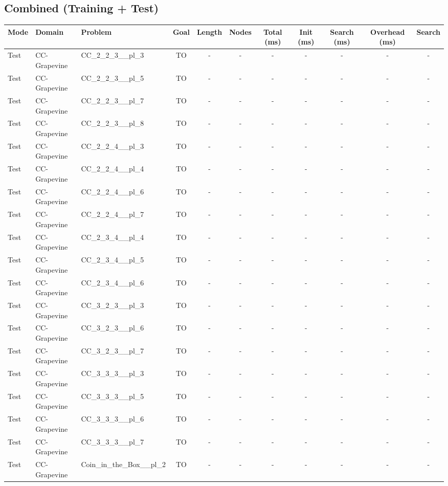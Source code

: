\documentclass{article}
\begin{document}
\subsection*{Combined (Training + Test)}
\begin{tabular}{lllcccccccc}
\toprule
Mode & Domain & Problem & Goal & Length & Nodes & Total (ms) & Init (ms) & Search (ms) & Overhead (ms) & Search \\
\midrule
Test & CC-Grapevine & CC\_2\_2\_3\_\_pl\_3 & TO & - & - & - & - & - & - & - \\
Test & CC-Grapevine & CC\_2\_2\_3\_\_pl\_5 & TO & - & - & - & - & - & - & - \\
Test & CC-Grapevine & CC\_2\_2\_3\_\_pl\_7 & TO & - & - & - & - & - & - & - \\
Test & CC-Grapevine & CC\_2\_2\_3\_\_pl\_8 & TO & - & - & - & - & - & - & - \\
Test & CC-Grapevine & CC\_2\_2\_4\_\_pl\_3 & TO & - & - & - & - & - & - & - \\
Test & CC-Grapevine & CC\_2\_2\_4\_\_pl\_4 & TO & - & - & - & - & - & - & - \\
Test & CC-Grapevine & CC\_2\_2\_4\_\_pl\_6 & TO & - & - & - & - & - & - & - \\
Test & CC-Grapevine & CC\_2\_2\_4\_\_pl\_7 & TO & - & - & - & - & - & - & - \\
Test & CC-Grapevine & CC\_2\_3\_4\_\_pl\_4 & TO & - & - & - & - & - & - & - \\
Test & CC-Grapevine & CC\_2\_3\_4\_\_pl\_5 & TO & - & - & - & - & - & - & - \\
Test & CC-Grapevine & CC\_2\_3\_4\_\_pl\_6 & TO & - & - & - & - & - & - & - \\
Test & CC-Grapevine & CC\_3\_2\_3\_\_pl\_3 & TO & - & - & - & - & - & - & - \\
Test & CC-Grapevine & CC\_3\_2\_3\_\_pl\_6 & TO & - & - & - & - & - & - & - \\
Test & CC-Grapevine & CC\_3\_2\_3\_\_pl\_7 & TO & - & - & - & - & - & - & - \\
Test & CC-Grapevine & CC\_3\_3\_3\_\_pl\_3 & TO & - & - & - & - & - & - & - \\
Test & CC-Grapevine & CC\_3\_3\_3\_\_pl\_5 & TO & - & - & - & - & - & - & - \\
Test & CC-Grapevine & CC\_3\_3\_3\_\_pl\_6 & TO & - & - & - & - & - & - & - \\
Test & CC-Grapevine & CC\_3\_3\_3\_\_pl\_7 & TO & - & - & - & - & - & - & - \\
Test & CC-Grapevine & Coin\_in\_the\_Box\_\_pl\_2 & TO & - & - & - & - & - & - & - \\

\end{tabular}
\end{document}
